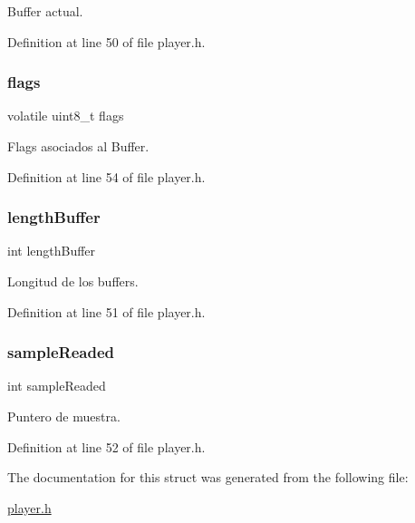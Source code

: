 Buffer actual. 



Definition at line 50 of file player.\+h.

\mbox{\label{struct_b_u_f_f_e_r_s_a27ac1730f3c9b0d5935ac0c406f7b9f3}} 
\subsubsection{\texorpdfstring{flags}{flags}}
{\footnotesize\ttfamily volatile uint8\+\_\+t flags}



Flags asociados al Buffer. 



Definition at line 54 of file player.\+h.

\mbox{\label{struct_b_u_f_f_e_r_s_ac2e1f44fd987b80899a7c4a2532af5ef}} 
\subsubsection{\texorpdfstring{length\+Buffer}{lengthBuffer}}
{\footnotesize\ttfamily int length\+Buffer}



Longitud de los buffers. 



Definition at line 51 of file player.\+h.

\mbox{\label{struct_b_u_f_f_e_r_s_ac6bbdc3545a0dbf8a4f7e405ce2adf3d}} 
\subsubsection{\texorpdfstring{sample\+Readed}{sampleReaded}}
{\footnotesize\ttfamily int sample\+Readed}



Puntero de muestra. 



Definition at line 52 of file player.\+h.



The documentation for this struct was generated from the following file\+:\begin{DoxyCompactItemize}
\item 
\mbox{\hyperlink{player_8h}{player.\+h}}\end{DoxyCompactItemize}
